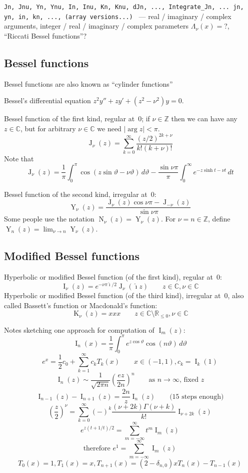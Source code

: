 \documentclass[10pt,dvipdfmx,letterpaper,twoside]{article}
\let\O=\operatorname
\newcommand{\RR}{{\mathbb{R}}}
\newcommand{\CC}{{\mathbb{C}}}
\newcommand{\ZZ}{{\mathbb{Z}}}
\newcommand{\ii}{{\hat{\imath}}}
\let\Gam=\Gamma
\let\theta=\vartheta
\begin{document}
{\tt Jn, Jnu, Yn, Ynu, In, Inu, Kn, Knu, dJn, ..., Integrate\_Jn, ...
jn, yn, in, kn, ..., (array versions...)
} --- real / imaginary / complex arguments, integer / real / imaginary / complex parameters
$\Lambda_\nu(x) = $?, ``Riccati Bessel functions''?

\subsection{Bessel functions}
Bessel functions are also known as ``cylinder functions''

Bessel's differential equation $z^2 y'' + z y' + (z^2-\nu^2) y = 0$.

Bessel function of the first kind, regular at~$0$; if $\nu\in\ZZ$ then we can have any $z\in\CC$, but
for arbitrary $\nu\in\CC$ we need $|\arg z|<\pi$.
\[ \O{J}_\nu(z) = \sum_{k=0}^\infty\frac{(z/2)^{2k+\nu}}{k!(k+\nu)!} \]
Note that
\[ \O{J}_\nu(z) = \frac{1}{\pi}\int_0^\pi\cos(z \sin\theta - \nu\theta)\,d\theta
  - \frac{\sin \nu\pi}{\pi}\int_0^\infty e^{-z \sinh t - \nu t}\,dt \]

Bessel function of the second kind, irregular at~$0$:
\[ \O{Y}_\nu(z) = \frac{\O{J}_\nu(z)\cos\nu\pi - \O{J}_{-\nu}(z)}{\sin \nu\pi} \]
Some people use the notation $\O{N}_\nu(z) = \O{Y}_\nu(z)$.
For $\nu=n\in\ZZ$, define $\O{Y}_n(z) = \lim_{\nu\to n}\O{Y}_\nu(z)$.

\subsection{Modified Bessel functions}

Hyperbolic or modified Bessel function (of the first kind), regular at~$0$:
\[ \O{I}_\nu(z) = e^{-\nu\pi\ii/2} \O{J}_\nu(\ii z) \qquad z\in\CC, \nu\in\CC \]
Hyperbolic or modified Bessel function (of the third kind), irregular at~$0$, also called Bassett's function or Macdonald's function:
\[ \O{K}_\nu(z) = xxx \qquad z\in\CC\setminus\RR_{\leq0}, \nu\in\CC \]

Notes sketching one approach for computation of $\O{I}_m(z)$:
\[ \O{I}_n(x) = \frac{1}{\pi} \int_0^\pi e^{z\cos\theta} \cos(n\theta)\,d\theta \]
\[ e^{x} = \frac12 c_0 + \sum_{k=1}^\infty c_k T_k(x) \qquad x\in(-1,1), c_k = \O{I}_k(1) \]
\[ \O{I}_n(z) \sim \frac{1}{\sqrt{2\pi n}}\left(\frac{ez}{2n}\right)^n \qquad\text{as $n\to\infty$, fixed $z$} \]
\[ \O{I}_{n-1}(z) - \O{I}_{n+1}(z) = \frac{2n}{z} \O{I}_n(z) \qquad\text{(15 steps enough)} \]
\[ \left(\frac{z}{2}\right)^{\nu} = \sum_{k=0}^\infty(-)^k \frac{(\nu+2k)\Gam(\nu+k)}{k!} \O{I}_{\nu+2k}(z) \]
\[ e^{z(t+1/t)/2} = \sum_{m=-\infty}^\infty t^m \O{I}_m(z) \]
\[ \text{therefore\ } e^1 = \sum_{m=-\infty}^\infty \O{I}_m(z) \]
\[ T_0(x) = 1, T_1(x) = x, T_{n+1}(x) = (2-\delta_{n,0})x T_{n}(x) - T_{n-1}(x) \]
\end{document}
